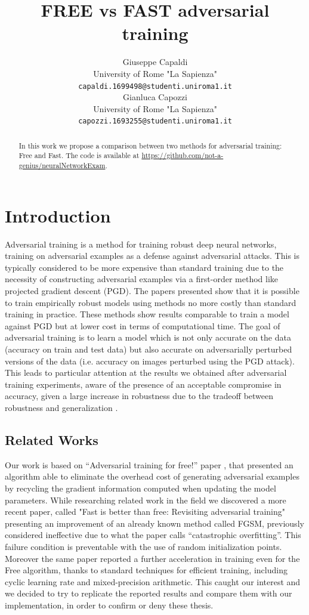 \documentclass{article}
\title{FREE vs FAST adversarial training}
\author{Giuseppe Capaldi\\
	University of Rome "La Sapienza"\\
	\texttt{capaldi.1699498@studenti.uniroma1.it}\\
	\And Gianluca Capozzi\\
	University of Rome "La Sapienza"\\
	\texttt{capozzi.1693255@studenti.uniroma1.it}\\
}
\begin{document}
\maketitle

\begin{abstract}
In this work we propose a comparison between two methods for adversarial
training: Free and Fast. The code is available at
\url{https://github.com/not-a-genius/neuralNetworkExam}.
\end{abstract}

\section{Introduction}
Adversarial training is a method for training robust deep neural networks,
training on adversarial examples as a defense against adversarial attacks. This
is typically considered to be more expensive than standard training due to the
necessity of constructing adversarial examples via a first-order method like
projected gradient descent (PGD). The papers presented show that it is possible
to train empirically robust models using methods no more costly than standard
training in practice. These methods show results comparable to train a model
against PGD but at lower cost in terms of computational time. The goal of
adversarial training is to learn a model which is not only accurate on the data
(accuracy on train and test data) but also accurate on adversarially perturbed
versions of the data (i.e. accuracy on images perturbed using the PGD attack).  
This leads to particular attention at the results we obtained after adversarial
training experiments, aware of the presence of an acceptable compromise in
accuracy, given a large increase in robustness due to the tradeoff between
robustness and generalization \cite{TsiprasEtAl, ZhangEtAl2019a,
ShafahiEtAl2019a}.

\subsection{Related Works}
Our work is based on “Adversarial training for free!” paper
\cite{ShafahiEtAl2019b}, that presented an algorithm able to eliminate the
overhead cost of generating adversarial examples by recycling the gradient
information computed when updating the model parameters. While researching
related work in the field we discovered a more recent paper, called "Fast is
better than free: Revisiting adversarial training" \cite{WongEtAl2020}
presenting an improvement of an already known method called FGSM, previously
considered ineffective due to what the paper calls “catastrophic overfitting”.
This failure condition is preventable with the use of random initialization
points. Moreover the same paper reported a further acceleration in training even
for the Free algorithm, thanks to standard techniques for efficient training,
including cyclic learning rate and mixed-precision arithmetic. This caught our
interest and we decided to try to replicate the reported results and compare
them with our implementation, in order to confirm or deny these thesis.
\end{document}
